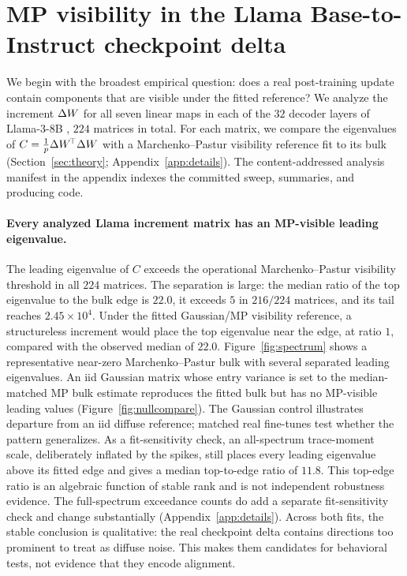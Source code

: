 \section{MP visibility in the Llama Base-to-Instruct checkpoint delta}
\label{sec:spectral}

We begin with the broadest empirical question: does a real post-training update
contain components that are visible under the fitted reference? We analyze the
increment $\Delta W$ for all seven linear maps in each of the $32$ decoder layers of
Llama-3-8B \citep{grattafiori2024llama3}, $224$ matrices in total. For each
matrix, we compare the eigenvalues of
$C = \tfrac1p \Delta W^{\!\top}\Delta W$ with a Marchenko--Pastur visibility reference fit
to its bulk (Section~\ref{sec:theory}; Appendix~\ref{app:details}). The
content-addressed analysis manifest in the appendix indexes the committed sweep,
summaries, and producing code.

\paragraph{Every analyzed Llama increment matrix has an MP-visible leading eigenvalue.}
The leading eigenvalue of $C$ exceeds the operational Marchenko--Pastur
visibility threshold in all
$224$ matrices. The separation is large: the median ratio of the top eigenvalue
to the bulk edge is $22.0$, it exceeds $5$ in $216/224$ matrices, and its tail
reaches $2.45\times 10^4$. Under the fitted Gaussian/MP visibility reference, a
structureless increment would place the top eigenvalue near the edge, at ratio
$1$, compared with the observed median of $22.0$. Figure~\ref{fig:spectrum}
shows a representative near-zero Marchenko--Pastur bulk with several separated
leading eigenvalues. An iid Gaussian matrix whose entry variance is set to the
median-matched MP bulk estimate reproduces the fitted bulk but has no
MP-visible leading values (Figure~\ref{fig:nullcompare}). The Gaussian control
illustrates departure from an iid diffuse reference; matched real fine-tunes test
whether the pattern generalizes.
As a fit-sensitivity check, an all-spectrum trace-moment scale, deliberately
inflated by the spikes, still places every leading eigenvalue above its fitted
edge and gives a median top-to-edge ratio of $11.8$. This top-edge ratio is an
algebraic function of stable rank and is not independent robustness evidence.
The full-spectrum exceedance counts do add a separate fit-sensitivity check and
change substantially (Appendix~\ref{app:details}).
Across both fits, the stable conclusion is qualitative: the real checkpoint
delta contains directions too prominent to treat as diffuse noise. This makes
them candidates for behavioral tests, not evidence that they encode alignment.

